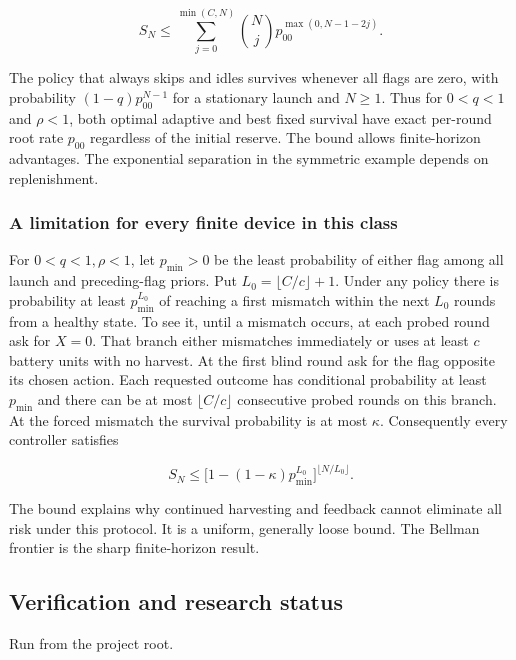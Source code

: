 \documentclass[
  11pt,
]{article}
\newenvironment{Shaded}{}{}
\newcommand{\FunctionTok}[1]{\textcolor[rgb]{0.02,0.16,0.49}{#1}}
\newcommand{\NormalTok}[1]{#1}
\newcommand{\OperatorTok}[1]{\textcolor[rgb]{0.40,0.40,0.40}{#1}}
\newcommand{\StringTok}[1]{\textcolor[rgb]{0.25,0.44,0.63}{#1}}
\newcommand{\VariableTok}[1]{\textcolor[rgb]{0.10,0.09,0.49}{#1}}
\begin{document}
\[
S_N\le\sum_{j=0}^{\min(C,N)}{N\choose j}
p_{00}^{\max(0,N-1-2j)}.
\]

The policy that always skips and idles survives whenever all flags are
zero, with probability \((1-q)p_{00}^{N-1}\) for a stationary launch and
\(N\ge1\). Thus for \(0<q<1\) and \(\rho<1\), both optimal adaptive and
best fixed survival have exact per-round root rate \(p_{00}\) regardless
of the initial reserve. The bound allows finite-horizon advantages. The
exponential separation in the symmetric example depends on
replenishment.

\subsubsection{A limitation for every finite device in this
class}\label{a-limitation-for-every-finite-device-in-this-class}

For \(0<q<1,\rho<1\), let \(p_{\min}>0\) be the least probability of
either flag among all launch and preceding-flag priors. Put
\(L_0=\lfloor C/c\rfloor+1\). Under any policy there is probability at
least \(p_{\min}^{L_0}\) of reaching a first mismatch within the next
\(L_0\) rounds from a healthy state. To see it, until a mismatch occurs,
at each probed round ask for \(X=0\). That branch either mismatches
immediately or uses at least \(c\) battery units with no harvest. At the
first blind round ask for the flag opposite its chosen action. Each
requested outcome has conditional probability at least \(p_{\min}\) and
there can be at most \(\lfloor C/c\rfloor\) consecutive probed rounds on
this branch. At the forced mismatch the survival probability is at most
\(\kappa\). Consequently every controller satisfies

\[
S_N \le \bigl[1-(1-\kappa)p_{\min}^{L_0}\bigr]^{\lfloor N/L_0\rfloor}.
\]

The bound explains why continued harvesting and feedback cannot
eliminate all risk under this protocol. It is a uniform, generally loose
bound. The Bellman frontier is the sharp finite-horizon result.

\subsection{Verification and research
status}\label{verification-and-research-status}

Run from the project root.

\begin{Shaded}
\end{Shaded}
\end{document}
